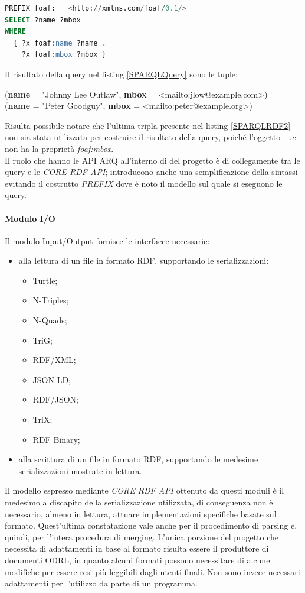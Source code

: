 \documentclass[12pt,a4paper,twoside]{book}
\begin{document}
\begin{lstlisting}[language=sql,firstnumber=1,caption={Query SPARQL per il recupero dei nomi e delle mail solo per soggetti che presentano entrambe le proprietà},captionpos=b,label=SPARQLQuery2]
PREFIX foaf:   <http://xmlns.com/foaf/0.1/>
SELECT ?name ?mbox
WHERE
  { ?x foaf:name ?name .
    ?x foaf:mbox ?mbox }
\end{lstlisting}\mbox{}
Il risultato della query nel listing \ref{SPARQLQuery} sono le tuple:
\begin{center}
(\textbf{name} = "Johnny Lee Outlaw", \textbf{mbox} = <mailto:jlow@example.com>)\\
(\textbf{name} = "Peter Goodguy",	\textbf{mbox} = <mailto:peter@example.org>)
\end{center}
Risulta possibile notare che l'ultima tripla presente nel listing \ref{SPARQLRDF2} non sia stata utilizzata per costruire il risultato della query, poiché l'oggetto \textit{\_:c} non ha la proprietà \textit{foaf:mbox}.\\
Il ruolo che hanno le API ARQ all'interno di del progetto è di collegamente tra le query e le \textit{CORE RDF API}; introducono anche una semplificazione della sintassi evitando il costrutto \textit{PREFIX} dove è noto il modello sul quale si eseguono le query.
\newpage
\paragraph{Modulo I/O}\mbox{}
Il modulo Input/Output fornisce le interfacce necessarie:
\begin{itemize}
\item alla lettura di un file in formato RDF, supportando le serializzazioni:
\begin{itemize}
\item Turtle;
\item N-Triples;
\item N-Quads;
\item TriG;
\item RDF/XML;
\item JSON-LD;
\item RDF/JSON;
\item TriX;
\item RDF Binary;
\end{itemize}
\item alla scrittura di un file in formato RDF, supportando le medesime serializzazioni mostrate in lettura.
\end{itemize}
Il modello espresso mediante \textit{CORE RDF API} ottenuto da questi moduli è il medesimo a discapito della serializzazione utilizzata, di conseguenza non è necessario, almeno in lettura, attuare implementazioni specifiche basate sul formato. Quest'ultima constatazione vale anche per il procedimento di parsing e, quindi, per l'intera procedura di merging. L'unica porzione del progetto che necessita di adattamenti in base al formato risulta essere il produttore di documenti ODRL, in quanto alcuni formati possono necessitare di alcune modifiche per essere resi più leggibili dagli utenti finali. Non sono invece necessari adattamenti per l'utilizzo da parte di un programma.
\end{document}
